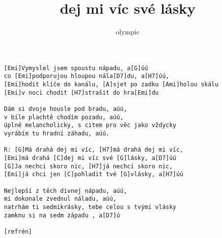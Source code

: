 \author{olympic}
\title{dej mi víc své lásky}
\maketitle
\begin{verbatim}
[Emi]Vymyslel jsem spoustu nápadu, a[G]úú
co [Emi]podporujou hloupou nála[D7]du, a[H7]úú,
[Emi]hodit klíče do kanálu, [A]sjet po zadku [Ami]holou skálu
[Emi]v noci chodit [H7]strašit do hra[Emi]du

Dám si dvoje housle pod bradu, aúú,
v bíle plachtě chodím pozadu, aúú,
úplně melancholicky, s citem pro věc jako vždycky
vyrábím tu hradní záhadu, aúú.

R: [G]Má drahá dej mi víc, [H7]má drahá dej mi víc,
[Emi]má drahá [C]dej mi víc své [G]lásky, a[D7]úú
[G]Ja nechci skoro nic, [H7]já nechci skoro nic,
[Emi]já chci jen [C]pohladit tvé [G]vlásky, a[H7]úú

Nejlepší z těch divnej nápadu, aúú,
mi dokonale zvednul náladu, aúú,
natrhám ti sedmikrásky, tebe celou s tvými vlásky
zamknu si na sedm západu , a[D7]ú

[refrén]
\end{verbatim}